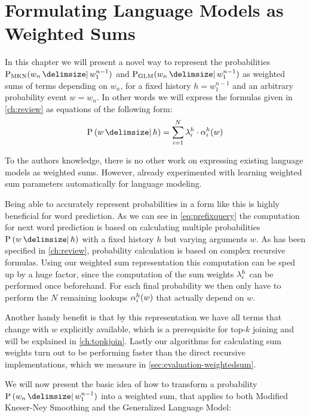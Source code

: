 \chapter{Formulating Language Models as Weighted Sums}
\label{ch:weightedsum}

In this chapter we will present a novel way to represent the probabilities
$\ProbMKN{w_n}{w_1^{n-1}}$ and $\ProbGLM{w_n}{w_1^{n-1}}$ as weighted sums of
terms depending on $w_n$, for a fixed history $h = w_1^{n-1}$ and an  arbitrary
probability event $w = w_n$.
In other words we will express the formulas given in \cref{ch:review} as
equations of the following form:
\begin{equation}
  \label{eq:weightedsum}
  \Prob{w}{h} = \sum_{i = 1}^{N} \SumWeight_i^h \cdot \SumArg_i^h(w)
\end{equation}

To the authors knowledge, there is no other work on expressing existing language
models as weighted sums.
However, \textcite{JelinekMercer1980} already experimented with learning
weighted sum parameters automatically for language modeling.

Being able to accurately represent probabilities in a form like this is highly
beneficial for word prediction.
As we can see in \cref{eq:prefixquery} the computation for next word prediction
is based on calculating multiple probabilities $\Prob{w}{h}$ with a fixed
history $h$ but varying arguments $w$.
As has been specified in \cref{ch:review}, probability calculation is based on
complex recursive formulas.
Using our weighted sum representation this computation can be sped up by
a huge factor, since the computation of the sum weights $\lambda^h_i$ can
be performed once beforehand.
For each final probability we then only have to perform the $N$ remaining
lookups $\alpha^h_i(w)$ that actually depend on $w$.

Another handy benefit is that by this representation we have all terms that
change with $w$ explicitly available, which is a prerequisite for top-$k$
joining and will be explained in \cref{ch:topkjoin}.
Lastly our algorithms for calculating sum weights turn out to be performing
faster than the direct recursive implementations, which we measure in
\cref{sec:evaluation-weightedsum}.

We will now present the basic idea of how to transform a probability
$\Prob{w_n}{w_1^{n-1}}$ into a weighted sum, that applies to both Modified
Kneser-Ney Smoothing and the Generalized Language Model:


